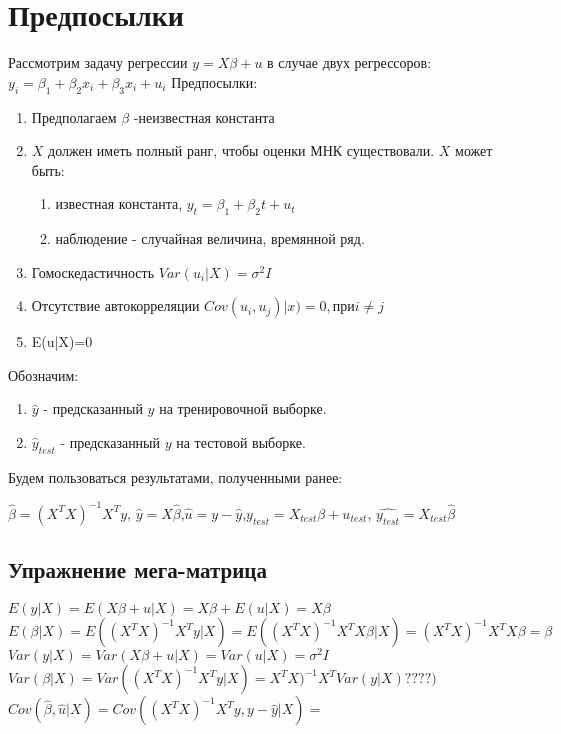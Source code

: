 \documentclass[12pt]{article} %
\theoremstyle{definition} %
\begin{document}
\section{Предпосылки}
Рассмотрим задачу регрессии $y=X\beta+u$ в случае двух регрессоров: $y_i=\beta_1+\beta_2x_i+\beta_3x_i+u_i$
Предпосылки:
\begin{enumerate}
    \item Предполагаем $\beta$ -неизвестная константа
    \item $X$ должен иметь полный ранг, чтобы оценки МНК существовали. $X$ может быть:
    \begin{enumerate}
        \item известная константа, $y_t=\beta_1+\beta_2t+u_t$
        \item наблюдение - случайная величина, времянной ряд.
    \end{enumerate}
    \item Гомоскедастичность ${Var}(u_i|X)=\sigma^2I$
    \item Отсутствие автокорреляции
    ${Cov}(u_i,u_j)|x)=0, при i\neq j$
    \item {E}(u|X)=0
\end{enumerate}
Обозначим:
\begin{enumerate}
    \item $\hat{y}$ - предсказанный $y$ на тренировочной выборке.
    \item $\hat{y}_{test}$ - предсказанный $y$ на тестовой выборке.
\end{enumerate}
\newpage
Будем пользоваться результатами, полученными ранее:

$\hat\beta=(X^TX)^{-1}X^Ty$,
$\hat{y}=X\hat\beta$,$\hat{u}=y-\hat{y}$,$y_{test}=X_{test}\beta+u_{test}$,
$\hat{y_{test}}=X_{test}\hat{\beta}$
\subsection{Упражнение мега-матрица}
${E}(y|X)={E}(X\beta+u|X)=X\beta+{E}(u|X)=X\beta$\\
${E}(\beta|X)={E}((X^TX)^{-1}X^Ty|X)={E}((X^TX)^{-1}X^TX\beta|X)=(X^TX)^{-1}X^TX\beta=\beta$\\
${Var}(y|X)={Var}(X\beta+u|X)={Var}(u|X)=\sigma^2I$\\
${Var}(\beta|X)={Var}((X^TX)^{-1}X^Ty|X)=X^TX)^{-1}X^T{Var}(y|X)????)$\\
${Cov}(\hat{\beta},\hat{u}|X)={Cov}((X^TX)^{-1}X^Ty,y-\hat{y}|X)=$\\\\
\end{document}
